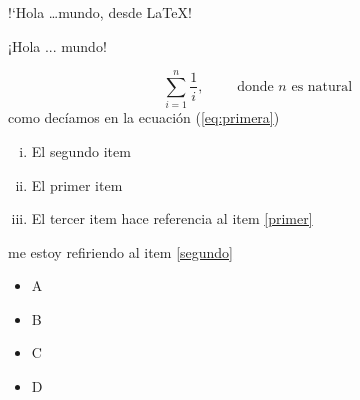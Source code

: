 \documentclass[12pt]{article}
\begin{document}
!`Hola \ldots mundo, desde \LaTeX!

¡Hola ... mundo!


\begin{equation}
  \label{eq:primera}
  \sum_{i=1}^{n}\frac{1}{i},\qquad\text{ donde } n \text{ es natural }
\end{equation}
como decíamos en la ecuación (\ref{eq:primera})

\begin{enumerate}[i)]
\item El segundo item \label{segundo}
\item El primer item \label{primer}
\item El tercer item \label{tercer} hace referencia al item \ref{primer}
\end{enumerate}

me estoy refiriendo al item \ref{segundo}

\begin{itemize}
\item A
\item B
\item C
\item D
\end{itemize}
\end{document}
